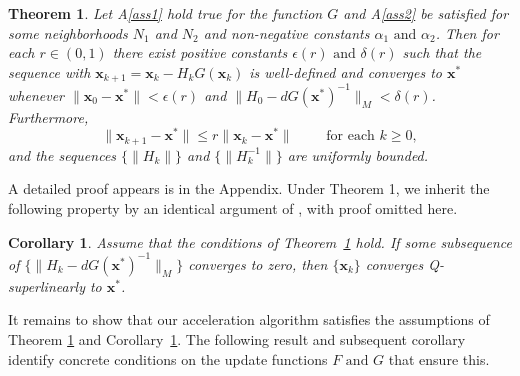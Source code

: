 \documentclass{statsoc}
\newtheorem{theorem}{Theorem}
\newtheorem{corollary}{Corollary}
\newcommand{\bx}{\boldsymbol{x}}
\begin{document}
\begin{theorem} \label{th:convergence}
Let A\ref{ass1} hold true for the function $G$ and A\ref{ass2} be satisfied for some neighborhoods $N_1$ and $N_2$ and non-negative constants $\alpha_1 \text{ and } \alpha_2$. Then for each $r \in (0,1)$ there exist positive constants $\epsilon(r) \text{ and } \delta(r)$ such that   the sequence with $\bx_{k+1} = \bx_k - H_kG(\bx_k)$ is well-defined and converges to $\bx^\ast$ whenever $\|\bx_0 - \bx^\ast\| < \epsilon(r)$ and $\|H_0 - dG(\bx^\ast)^{-1}\|_M < \delta(r)$. Furthermore,
\[
\|\bx_{k+1} - \bx^\ast\| \leq r\|\bx_k - \bx^\ast\| \qquad \text{ for each } k \geq 0,
\]
and the sequences $\{\|H_k\|\}$ and $\{\|H_{k}^{-1}\|\}$ are uniformly bounded.
\end{theorem}
A detailed proof appears is in the Appendix. %
Under Theorem 1, we inherit the following property by an identical argument of \citet{broyden1973local}, with proof omitted here.

\begin{corollary} \label{cor:superlinear_conv}
Assume that the conditions of Theorem~\ref{th:convergence} hold. If some subsequence of $\{\|H_k - dG(\bx^\ast)^{-1}\|_M\}$ converges to zero, then $\{\bx_k\}$ converges Q-superlinearly to $\bx^\ast$.
\end{corollary}

It remains to show that our acceleration algorithm satisfies the assumptions of Theorem \ref{th:convergence} and Corollary~\ref{cor:superlinear_conv}. The following result and subsequent corollary identify concrete conditions on the update functions $F \text{ and } G$ that ensure this. %
\end{document}
